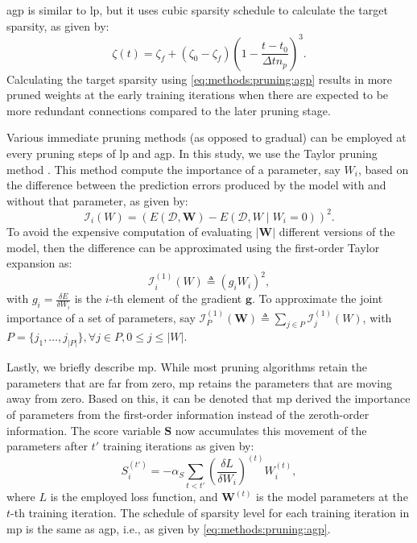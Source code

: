 \documentclass[mathematics,article,submit,pdftex,moreauthors]{Definitions/mdpi}
\renewcommand{\vec}[1]{\bm{#1}}
\begin{document}
\ac{agp} is similar to \ac{lp}, but it uses cubic sparsity
schedule to calculate the target sparsity, as given by:
\begin{equation}
    \zeta(t) = \zeta_f + (\zeta_0-\zeta_f)(1-\frac{t-t_0}{\Delta t n_p})^3.
\label{eq:methods:pruning:agp}
\end{equation}
Calculating the target sparsity using \eqref{eq:methods:pruning:agp}
results in more pruned weights at the early training iterations
when there are expected to be more redundant connections
compared to the later pruning stage. 

Various immediate pruning methods (as opposed to gradual)
can be employed at every pruning steps of \ac{lp}
and \ac{agp}. In this study, we use the Taylor
pruning method \cite{Molchanov2019}. This method
compute the importance of a parameter, say $W_i$,
based on the difference between the prediction errors
produced by the model with and without that parameter,
as given by:
\begin{equation}
    \mathcal{I}_{i}(W) = \left( E(\mathcal{D}, \vec{W}) - E(\mathcal{D}, W \mid W_i=0) \right)^2.
\end{equation}
To avoid the expensive computation of evaluating 
$|\vec{W}|$ different versions of the model, then
the difference can be approximated using the first-order
Taylor expansion as:
\begin{equation}
    \mathcal{I}^{(1)}_{i}(W) \triangleq \left( g_i W_i \right)^2,
\end{equation}
with $g_i = \frac{\delta E}{\delta W_i}$ is the $i$-th
element of the gradient $\vec{g}$. To approximate
the joint importance of a set of parameters,
say $\mathcal{I}^{(1)}_P(\vec{W}) \triangleq \sum_{j \in P} 
\mathcal{I}^{(1)}_{j}(W)$, with $P = \{j_1,\ldots, j_{|P|}\},
\forall j \in P, 0\leq j\leq |W|$.

Lastly, we briefly describe \ac{mp}. 
While most pruning algorithms retain the parameters
that are far from zero, \ac{mp} retains the parameters
that are moving away from zero. Based on this,
it can be denoted that \ac{mp} derived
the importance of parameters from the first-order
information instead of the zeroth-order information.
The score variable $\vec{S}$ now accumulates this movement
of the parameters after $t'$ training iterations as given by:
\begin{equation}
    S^{(t')}_i = - \alpha_S \sum_{t<t'} \left(\frac{\delta L}{\delta W_i}\right)^{(t)} W^{(t)}_i,
\end{equation}
where $L$ is the employed loss function, and $\vec{W}^{(t)}$ is the
model parameters at the $t$-th training iteration. The schedule
of sparsity level for each training iteration in \ac{mp}
is the same as \ac{agp}, i.e., as given by \eqref{eq:methods:pruning:agp}.
\end{document}
